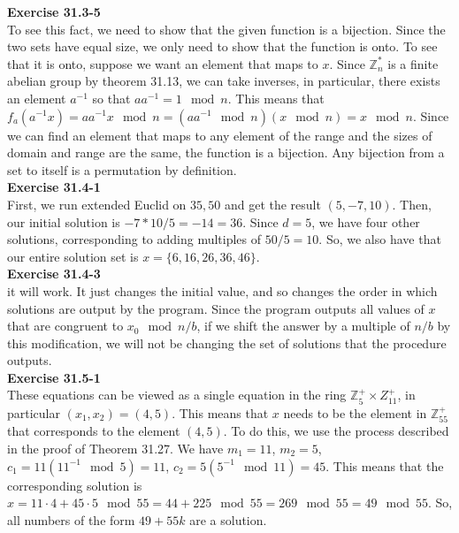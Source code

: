 \documentclass{article}
\newcommand{\Z}{\mathbb{Z}}
\begin{document}
\noindent\textbf{Exercise 31.3-5}\\

To see this fact, we need to show that the given function is a bijection. Since the two sets have equal size, we only need to show that the function is onto. To see that it is onto, suppose we want an element that maps to $x$. Since $\Z_n^*$ is a finite abelian group by theorem 31.13, we can take inverses, in particular, there exists an element $a^{-1}$ so that $a a^{-1} = 1 \mod n$. This means that $f_a(a^{-1} x) =a a^{-1} x \mod n = (a a^{-1} \mod n) (x \mod n) = x \mod n$. Since we can find an element that maps to any element of the range and the sizes of domain and range are the same, the function is a bijection. Any bijection from a set to itself is a permutation by definition.\\



\noindent\textbf{Exercise 31.4-1}\\

First, we run extended Euclid on $35,50$ and get the result $(5,-7,10)$. Then, our initial solution is $-7*10/5 = -14 = 36$. Since $d=5$, we have four other solutions, corresponding to adding multiples of $50/5 =10$. So, we also have that our entire solution set is $x =\{6,16,26,36,46\}$.\\



\noindent\textbf{Exercise 31.4-3}\\

it will work. It just changes the initial value, and so changes the order in which solutions are output by the program. Since the program outputs all values of $x$ that are congruent to $x_0 \mod n/b$, if we shift the answer by a multiple of $n/b$ by this modification, we will not be changing the set of solutions that the procedure outputs.\\



\noindent\textbf{Exercise 31.5-1}\\

These equations can be viewed as a single equation in the ring $\Z_5^+ \times Z_11^+$, in particular $(x_1,x_2) = (4,5)$. This means that $x$ needs to be the element in $\Z_55^+$ that corresponds to the element $(4,5)$. To do this, we use the process described in the proof of Theorem 31.27. We have $m_1 = 11$, $m_2 = 5$, $c_1 = 11(11^{-1} \mod 5) = 11 $, $c_2 = 5(5^{-1} \mod 11) = 45$. This means that the corresponding solution is $x = 11\cdot4 + 45\cdot 5 \mod 55 = 44 + 225 \mod 55= 269 \mod 55 = 49\mod 55$. So, all numbers of the form $49 + 55k$ are a solution.\\ 
\end{document}
